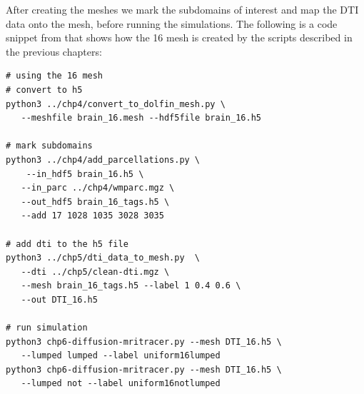 After creating the meshes we mark the subdomains of interest and map the DTI data onto the mesh, before 
running the simulations. The following is a code snippet from  that shows how
the 16 mesh is created by the scripts described in the previous chapters: 
\begin{lstlisting}[style=bashStyle]
# using the 16 mesh 
# convert to h5
python3 ../chp4/convert_to_dolfin_mesh.py \
   --meshfile brain_16.mesh --hdf5file brain_16.h5

# mark subdomains  
python3 ../chp4/add_parcellations.py \
    --in_hdf5 brain_16.h5 \
   --in_parc ../chp4/wmparc.mgz \
   --out_hdf5 brain_16_tags.h5 \
   --add 17 1028 1035 3028 3035

# add dti to the h5 file 
python3 ../chp5/dti_data_to_mesh.py  \
   --dti ../chp5/clean-dti.mgz \
   --mesh brain_16_tags.h5 --label 1 0.4 0.6 \
   --out DTI_16.h5 

# run simulation 
python3 chp6-diffusion-mritracer.py --mesh DTI_16.h5 \
   --lumped lumped --label uniform16lumped 
python3 chp6-diffusion-mritracer.py --mesh DTI_16.h5 \
   --lumped not --label uniform16notlumped 
\end{lstlisting}


